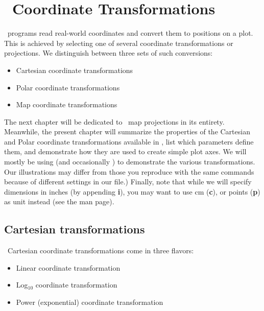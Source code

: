 %
%
\chapter{\gmt\ Coordinate Transformations}
\label{ch:5}
\thispagestyle{headings}

\GMT\ programs read real-world coordinates and convert them to positions on a plot.
This is achieved by selecting one of several coordinate transformations or projections.
We distinguish between three sets of such conversions:

\begin{itemize}
\item Cartesian coordinate transformations
\item Polar coordinate transformations
\item Map coordinate transformations
\end{itemize}

The next chapter will be dedicated to \GMT\ map projections in its entirety.  Meanwhile, the present chapter
will summarize the properties of the Cartesian and Polar coordinate transformations available in \GMT, list
which parameters define them, and demonstrate how they are used to create simple plot axes.  We will mostly
be using  (and occasionally ) to demonstrate the various transformations.
Our illustrations may differ from those you reproduce with the same commands because of different settings
in our  file.)  Finally, note that while we will specify dimensions in inches (by
appending \textbf{i}), you may want to use cm (\textbf{c}), or points (\textbf{p}) as unit instead
(see the  man page). 

\section{Cartesian transformations}

\GMT\ Cartesian coordinate transformations come in three flavors:

\begin{itemize}
\item Linear coordinate transformation
\item Log$_{10}$ coordinate transformation
\item Power (exponential) coordinate transformation
\end{itemize}

